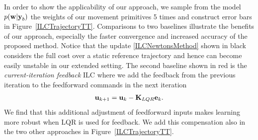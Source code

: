 
In order to show the applicability of our approach, we sample from the model $p(\boldsymbol{\mathrm{w}}|\boldsymbol{\mathrm{y}}_b)$ the weights of our movement primitives 5 times and construct error bars in Figure~\ref{ILCTrajectoryTT}. Comparisons to two baselines illustrate the benefits of our approach, especially the faster convergence and increased accuracy of the proposed method. Notice that the update \eqref{ILCNewtonsMethod} shown in black considers the full cost over a static reference trajectory and hence can become easily unstable in our extended setting. The second baseline shown in red is the \emph{current-iteration feedback} ILC where we add the feedback from the previous iteration to the feedforward commands in the next iteration
%
\begin{equation}
\begin{aligned}
\boldsymbol{\mathrm{u}}_{k+1} &= \boldsymbol{\mathrm{u}}_k - \boldsymbol{\mathrm{K}}_{LQR}\boldsymbol{\mathrm{e}}_{k}.\\
\end{aligned}
\label{fbILC}
\end{equation}
%
\noindent We find that this additional adjustment of feedforward inputs makes learning more robust when LQR is used for feedback. We add this compensation also in the two other approaches in Figure~\ref{ILCTrajectoryTT}.



